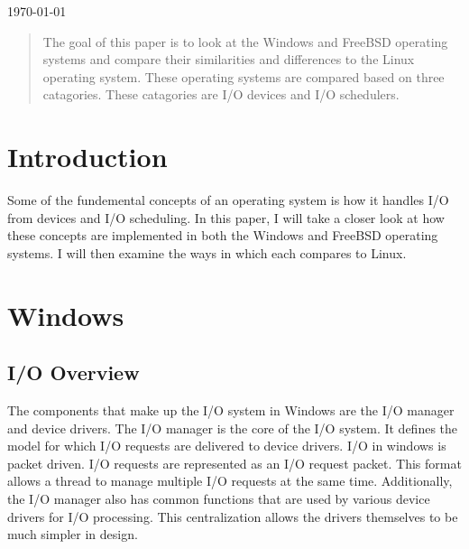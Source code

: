 \documentclass[journal,letterpaper,draftclsnofoot,onecolumn,10pt]{IEEEtran}
\begin{document}
\begin{titlepage}

{\large \today}\\[3cm] %

\begin{abstract}
The goal of this paper is to look at the Windows and FreeBSD operating systems and compare their similarities and differences to the Linux operating system. These operating systems are compared based on three catagories. These catagories are I/O devices and I/O schedulers.
\end{abstract}

\vfill %

\pagebreak

\end{titlepage}

\setlength{\parindent}{3ex}

\section{Introduction}
Some of the fundemental concepts of an operating system is how it handles I/O from devices and I/O scheduling. In this paper, I will take a closer look at how these concepts are implemented in both the Windows and FreeBSD operating systems. I will then examine the ways in which each compares to Linux.

\section{Windows}

\subsection{I/O Overview}
The components that make up the I/O system in Windows are the I/O manager and device drivers. The I/O manager is the core of the I/O system. It defines the model for which I/O requests are delivered to device drivers. I/O in windows is packet driven. I/O requests are represented as an I/O request packet. This format allows a thread to manage multiple I/O requests at the same time. Additionally, the I/O manager also has common functions that are used by various device drivers for I/O processing. This centralization allows the drivers themselves to be much simpler in design.\cite{2ris12}
\end{document}
